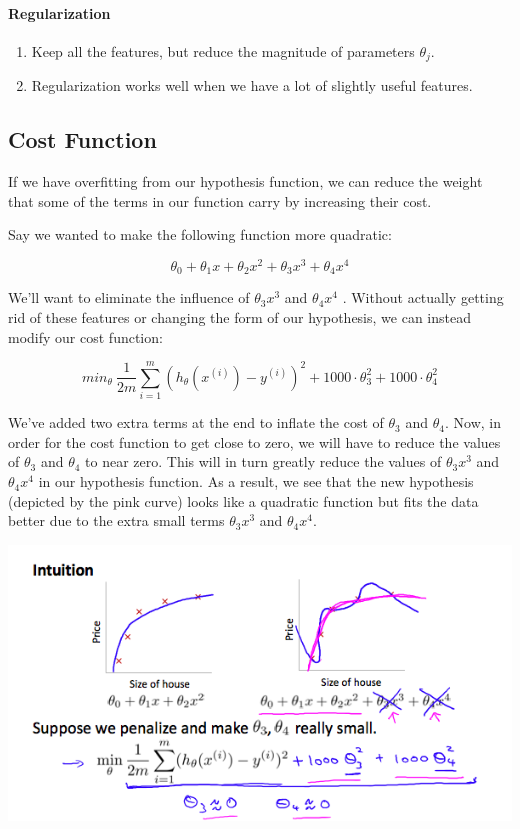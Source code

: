 \documentclass[UTF8]{article}
\begin{document}
\paragraph{Regularization}
\begin{enumerate}[(1)] 
\item Keep all the features, but reduce the magnitude of parameters $\theta_j$.
\item Regularization works well when we have a lot of slightly useful features.
\end{enumerate}

\subsection{Cost Function}

If we have overfitting from our hypothesis function, we can reduce the weight that some of the terms in our function carry by increasing their cost.

Say we wanted to make the following function more quadratic:

\[\theta_0 + \theta_1x + \theta_2x^2 + \theta_3x^3 + \theta_4x^4\]

We'll want to eliminate the influence of $\theta_3x^3$ and $\theta_4x^4$ . Without actually getting rid of these features or changing the form of our hypothesis, we can instead modify our cost function:

\[min_\theta\ \dfrac{1}{2m}\sum_{i=1}^m (h_\theta(x^{(i)}) - y^{(i)})^2 + 1000\cdot\theta_3^2 + 1000\cdot\theta_4^2\]

We've added two extra terms at the end to inflate the cost of $\theta_3$ and $\theta_4$. Now, in order for the cost function to get close to zero, we will have to reduce the values of $\theta_3$ and $\theta_4$ to near zero. This will in turn greatly reduce the values of $\theta_3x^3$ and $\theta_4x^4$ in our hypothesis function. As a result, we see that the new hypothesis (depicted by the pink curve) looks like a quadratic function but fits the data better due to the extra small terms $\theta_3x^3$ and $\theta_4x^4$.

\includegraphics[width = \textwidth]{NotePics/7_2_1.png}
\end{document}
